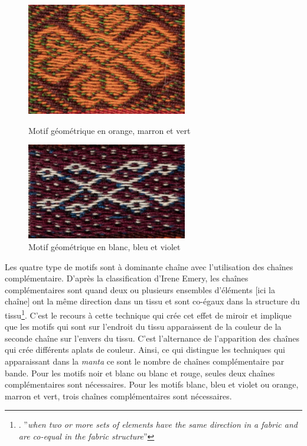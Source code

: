 \documentclass[a4paper, twoside, 12pt]{book}
\begin{document}
\begin{figure}[!h]
    \begin{minipage}[c]{.5\linewidth}
            \begin{center}
                \includegraphics[width=7cm]{images/A1_F07.jpg}
                \caption[Motif orange, marron et vert]{Motif géométrique en orange, marron et vert}
                \label{omv}
            \end{center}
    \end{minipage}
    \begin{minipage}[c]{.5\linewidth}
        \begin{center}
            \includegraphics[width=7cm]{images/A1_I13.jpg}
            \caption[Motif blanc, bleu et violet]{Motif géométrique en blanc, bleu et violet}
            \label{bbv}
        \end{center}
    \end{minipage}
\end{figure}

Les quatre type de motifs sont à dominante chaîne avec l'utilisation des chaînes complémentaire. D'après la classification d'Irene Emery, les chaînes complémentaires sont quand \og deux ou plusieurs ensembles d’éléments [ici la chaîne] ont la même direction dans un tissu et sont co-égaux dans la structure du tissu\fg\footnote{\cite[p.~150]{emeryPrimaryStructuresFabrics1995}. ''\textit{when two or more sets of elements have the same direction in a fabric and are co-equal in the fabric structure}''}. C'est le recours à cette technique qui crée cet effet de miroir et implique que les motifs qui sont sur l'endroit du tissu apparaissent de la couleur de la seconde chaîne sur l'envers du tissu. C'est l'alternance de l'apparition des chaînes qui crée différents aplats de couleur. Ainsi, ce qui distingue les techniques qui apparaissant dans la \textit{manta} ce sont le nombre de chaînes complémentaire par bande. Pour les motifs noir et blanc ou blanc et rouge, seules deux chaînes complémentaires sont nécessaires. Pour les motifs blanc, bleu et violet ou orange, marron et vert, trois chaînes complémentaires sont nécessaires. 
\end{document}
